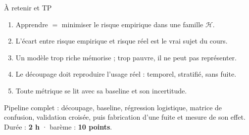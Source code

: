 \begin{frame}{À retenir et TP}
\begin{kbox}
\begin{enumerate}
  \item Apprendre $=$ minimiser le risque empirique dans une famille $\mathcal{H}$.
  \item L'écart entre risque empirique et risque réel est le vrai sujet du cours.
  \item Un modèle trop riche mémorise ; trop pauvre, il ne peut pas représenter.
  \item Le découpage doit reproduire l'usage réel : temporel, stratifié, sans fuite.
  \item Toute métrique se lit avec sa baseline et son incertitude.
\end{enumerate}
\end{kbox}
\vspace{1.5mm}
\begin{abox}
Pipeline complet : découpage, baseline, régression logistique, matrice de
confusion, validation croisée, puis fabrication d'une fuite et mesure de son
effet. Durée : \textbf{2 h} · barème : \textbf{10 points}.
\end{abox}
\end{frame}
